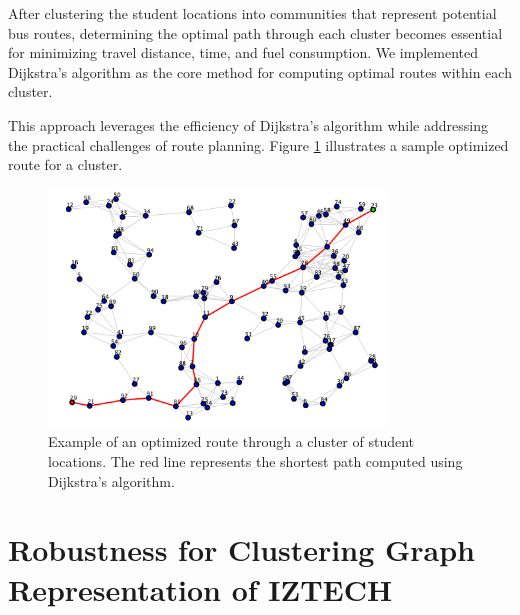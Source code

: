 After clustering the student locations into communities that represent potential bus routes, determining the optimal path through each cluster becomes essential for minimizing travel distance, time, and fuel consumption. We implemented Dijkstra's algorithm as the core method for computing optimal routes within each cluster.

This approach leverages the efficiency of Dijkstra's algorithm while addressing the practical challenges of route planning. Figure \ref{fig:route_optimization} illustrates a sample optimized route for a cluster.

\begin{figure}[!htbp]
\centering
\includegraphics[width=0.8\textwidth]{img/shortest_path}
\caption{Example of an optimized route through a cluster of student locations. The red line represents the shortest path computed using Dijkstra's algorithm.}
\label{fig:route_optimization}
\end{figure}

\section{Robustness for Clustering Graph Representation of IZTECH}
\label{sec:robustness}




